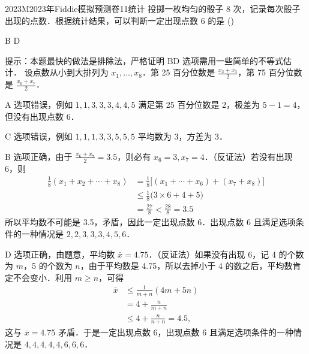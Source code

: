 
\begin{problem}{2023}{M}{2023年Fiddie模拟预测卷}{11}{统计}
投掷一枚均匀的骰子 8 次，记录每次骰子出现的点数．根据统计结果，可以判断一定出现点数 6 的是 (\hspace{1cm})
\begin{choices}
\end{choices}
\end{problem}

\begin{answer}
B D
\end{answer}

\begin{solutions}
提示：本题最快的做法是排除法，严格证明 BD 选项需用一些简单的不等式估计．  
设点数从小到大排列为 $ x_1,\dots,x_8 $．第 25 百分位数是 $ \displaystyle\frac{x_2+x_3}{2} $，第 75 百分位数是 $ \displaystyle\frac{x_6+x_7}{2} $．  

A 选项错误，例如 $ 1,1,3,3,3,4,4,5 $ 满足第 25 百分位数是 2，极差为 $ 5-1=4 $，但没有出现点数 6．  

C 选项错误，例如 $ 1,1,1,3,3,5,5,5 $ 平均数为 3，方差为 3．  

B 选项正确，由于 $ \displaystyle\frac{x_6+x_7}{2}=3.5 $，则必有 $ x_6=3,x_7=4 $．（反证法）若没有出现 6，则  
$$
\begin{aligned}
\frac{1}{8}(x_1+x_2+\cdots+x_8) &= \frac{1}{8}\bigl[(x_1+\cdots+x_6)+(x_7+x_8)\bigr] \\
&\leq \frac{1}{8}\bigl(3\times 6+4+5\bigr) \\
&= \frac{27}{8} < \frac{28}{8} = 3.5
\end{aligned}
$$  
所以平均数不可能是 3.5，矛盾，因此一定出现点数 6．出现点数 6 且满足选项条件的一种情况是 $ 2,2,3,3,3,4,5,6 $．  

D 选项正确，由题意，平均数 $ \bar{x}=4.75 $．（反证法）如果没有出现 6，记 4 的个数为 $ m $，5 的个数为 $ n $，由于平均数是 4.75，所以去掉小于 4 的数之后，平均数肯定不会变小．利用 $ m\geq n $，可得  
$$
\begin{aligned}
\bar{x} &\leq \frac{1}{m+n}(4m+5n) \\
&= 4+\frac{n}{m+n} \\
&\leq 4+\frac{n}{n+n} = 4.5,
\end{aligned}
$$  
这与 $ \bar{x}=4.75 $ 矛盾．于是一定出现点数 6，出现点数 6 且满足选项条件的一种情况是 $ 4,4,4,4,4,6,6,6 $．
\end{solutions}
